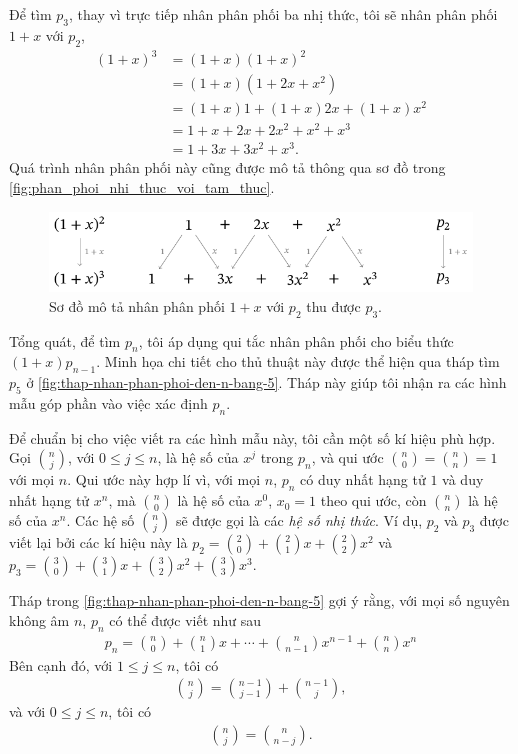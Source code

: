 \documentclass[12pt]{article} %
\begin{document}
Để tìm \(p_3\), thay vì trực tiếp nhân phân phối ba nhị thức, tôi sẽ nhân phân phối \(1+x\) với \(p_2\),
\begin{align*}
    (1+x)^3
        & = (1+x)(1+x)^2 \\
        & = (1+x)(1+2x+x^2) \\
        & = (1+x)1+(1+x)2x+(1+x)x^2\\
        & = 1 + x + 2x + 2x^2 + x^2 +x^3\\
        & = 1 + 3x + 3x^2 + x^3.
\end{align*}
Quá trình nhân phân phối này cũng được mô tả thông qua sơ đồ trong \autoref{fig:phan_phoi_nhi_thuc_voi_tam_thuc}.
\begin{figure}[htbp]
    \centering
    \includegraphics*[scale=1]{./tex-images/so-do-nhan-phan-phoi-nhi-thuc-voi-tam-thuc/so-do-nhan-phan-phoi-nhi-thuc-voi-tam-thuc.pdf}
    \caption{Sơ đồ mô tả nhân phân phối \(1+x\) với \(p_2\) thu được \(p_3\).}
    \label{fig:so-do-nhan-phan-phoi-nhi-thuc-voi-tam-thuc}
\end{figure}

Tổng quát, để tìm \(p_n\), tôi áp dụng qui tắc nhân phân phối cho biểu thức \((1+x)p_{n-1}\). Minh họa chi tiết cho thủ thuật này được thể hiện qua tháp tìm \(p_5\) ở \autoref{fig:thap-nhan-phan-phoi-den-n-bang-5}. Tháp này giúp tôi nhận ra các hình mẫu góp phần vào việc xác định \(p_n\). 

Để chuẩn bị cho việc viết ra các hình mẫu này, tôi cần một số kí hiệu phù hợp. Gọi \(\binom{n}{j}\), với \(0\leq j \leq n\), là hệ số của \(x^j\) trong \(p_n\), và qui ước \(\binom{n}{0}=\binom{n}{n}=1\) với mọi \(n\). Qui ước này hợp lí vì, với mọi \(n\), \(p_n\) có duy nhất hạng tử \(1\) và duy nhất hạng tử \(x^n\), mà \(\binom{n}{0}\) là hệ số của \(x^0\), \(x_0=1\) theo qui ước, còn \(\binom{n}{n}\) là hệ số của \(x^n\). Các hệ số \(\binom{n}{j}\) sẽ được gọi là các \emph{hệ số nhị thức}. Ví dụ, \(p_2\) và \(p_3\) được viết lại bởi các kí hiệu này là \(p_2=\binom{2}{0}+\binom{2}{1}x+\binom{2}{2}x^2\) và \(p_3=\binom{3}{0}+\binom{3}{1}x+\binom{3}{2}x^2+\binom{3}{3}x^3\).

Tháp trong \autoref{fig:thap-nhan-phan-phoi-den-n-bang-5} gợi ý rằng, với mọi số nguyên không âm \(n\), \(p_n\) có thể được viết như sau
\begin{align}
    p_n=\binom{n}{0}+\binom{n}{1}x+\cdots+\binom{n}{n-1}x^{n-1}+\binom{n}{n}x^n \label{eq:dang-khai-trien}
\end{align}
Bên cạnh đó, với \(1\leq j\leq n\), tôi có 
\begin{align}
    \binom{n}{j}=\binom{n-1}{j-1}+\binom{n-1}{j}, \label{eq:tinh-he-so-nhi-thuc-theo-chieu-doc}
\end{align}
và với \(0\leq j\leq n\), tôi có 
\begin{align}
    \binom{n}{j}=\binom{n}{n-j}. \label{eq:tinh-doi-xung}
\end{align}
\end{document}
